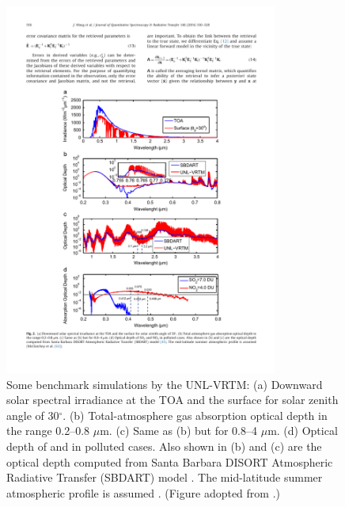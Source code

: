 \begin{figure}[p]
  \centering
  \includegraphics[width={0.8\textwidth}]{figures/unlvrtm1.pdf}
  \caption{Some benchmark simulations by the UNL-VRTM: 
(a) Downward solar spectral irradiance at the TOA and the
surface for solar zenith angle of 30$^\circ$. (b) Total-atmosphere gas
absorption optical depth in the range 0.2--0.8 $\mu$m. (c) Same as (b) but
for 0.8--4 $\mu$m. (d) Optical depth of  and  in
 polluted cases. Also shown in (b) and (c) are the optical depth computed 
from Santa Barbara DISORT Atmospheric Radiative Transfer (SBDART) model
\citep{Ricchiazzi98}. The mid-latitude summer atmospheric profile is 
assumed \citep{McClatchey72}. (Figure adopted from \citet{Wang14}.)}
  \label{fig:unlvrtm1}
\end{figure}

